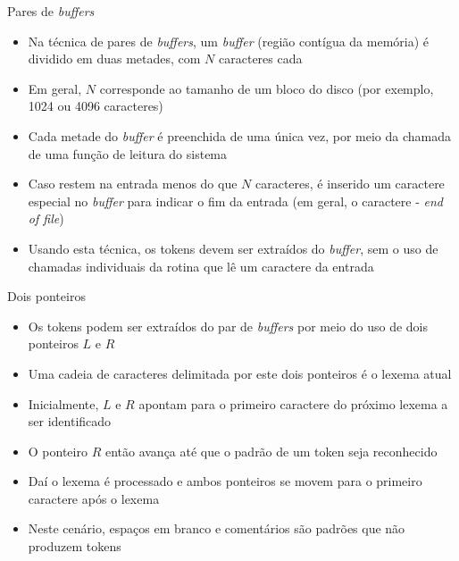 \begin{frame}[fragile]{Pares de {\it buffers}}

    \begin{itemize}
        \item Na técnica de pares de \textit{buffers}, um \textit{buffer} (região contígua da memória) é dividido em duas metades, com $N$ caracteres cada

        \item Em geral, $N$ corresponde ao tamanho de um bloco do disco (por exemplo, 1024 ou 4096 caracteres)

        \item Cada metade do \textit{buffer} é preenchida de uma única vez, por meio da chamada de uma função de leitura do sistema

        \item Caso restem na entrada menos do que $N$ caracteres, é inserido um caractere especial no \textit{buffer} para indicar o fim da entrada
            (em geral, o caractere  - \textit{end of file})

        \item Usando esta técnica, os tokens devem ser extraídos do \textit{buffer}, sem o uso de chamadas individuais da rotina que lê um caractere da entrada
    \end{itemize}

\end{frame}

\begin{frame}[fragile]{Dois ponteiros}

    \begin{itemize}
        \item Os tokens podem ser extraídos do par de \textit{buffers} por meio do uso de dois ponteiros $L$ e $R$

        \item Uma cadeia de caracteres delimitada por este dois ponteiros é o lexema atual

        \item Inicialmente, $L$ e $R$ apontam para o primeiro caractere do próximo lexema a ser identificado

        \item O ponteiro $R$ então avança até que o padrão de um token seja reconhecido

        \item Daí o lexema é processado e ambos ponteiros se movem para o primeiro caractere após o lexema

        \item Neste cenário, espaços em branco e comentários são padrões que não produzem tokens
    \end{itemize}

\end{frame}

